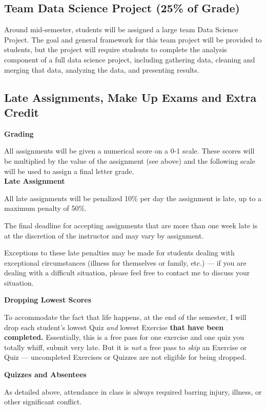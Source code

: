 \documentclass[12pt]{article}
\begin{document}
\subsection{Team Data Science Project  (25\% of Grade)}

Around mid-semester, students will be assigned a large team Data Science Project. The goal and general framework for this team project will be provided to students, but the project will require students to complete the analysis component of a full data science project, including gathering data, cleaning and merging that data, analyzing the data, and presenting results.

\subsection{Late Assignments, Make Up Exams and Extra Credit}


\textbf{Grading}

All assignments will be given a numerical score on a 0-1 scale.  These scores will be multiplied by the value of the assignment (see above) and the following scale will be used to assign a final letter grade.  \\


\textbf{Late Assignment}

All late assignments will be penalized 10\% per day the assignment is late, up to a maximum penalty of 50\%.

The final deadline for accepting assignments that are more than one week late is at the discretion of the instructor and may vary by assignment. 

Exceptions to these late penalties may be made for students dealing with exceptional circumstances (illness for themselves or family, etc.) — if you are dealing with a difficult situation, please feel free to contact me to discuss your situation.

\textbf{Dropping Lowest Scores}

To accommodate the fact that life happens, at the end of the semester, I will drop each student's lowest Quiz \emph{and} lowest Exercise \textbf{that have been completed.} Essentially, this is a free pass for one exercise and one quiz you totally whiff, submit very late. But it is \emph{not} a free pass to \emph{skip} an Exercise or Quiz — uncompleted Exercises or Quizzes are not eligible for being dropped.

\textbf{Quizzes and Absentees}

As detailed above, attendance in class is always required barring injury, illness, or other significant conflict. 
\end{document}

